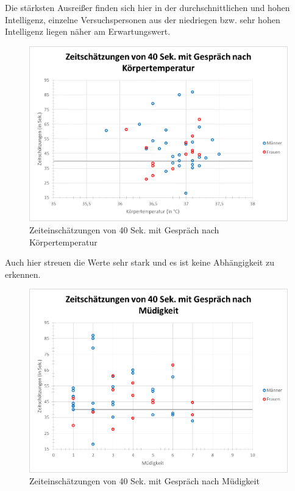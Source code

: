 \documentclass{Paper}
\begin{document}
Die stärksten Ausreißer finden sich hier in der durchschnittlichen und hohen Intelligenz, einzelne Versuchspersonen aus der niedriegen bzw. sehr hohen Intelligenz liegen näher am Erwartungswert. 

\begin{figure}[H]
	\centering
	\includegraphics[scale=0.7]{../Diagramme/scatterPost/40mit_koerpertemperatur.png}
	\caption{Zeiteinschätzungen von 40 Sek. mit Gespräch nach Körpertemperatur}
	\label{img:posttemp40mit}
\end{figure}

Auch hier streuen die Werte sehr stark und es ist keine Abhängigkeit zu erkennen.


\begin{figure}[H]
	\centering
	\includegraphics[scale=0.7]{../Diagramme/scatterPost/40mit_muedigkeit.png}
	\caption{Zeiteinschätzungen von 40 Sek. mit Gespräch nach Müdigkeit}
	\label{img:postmued40mit}
\end{figure}
\end{document}
